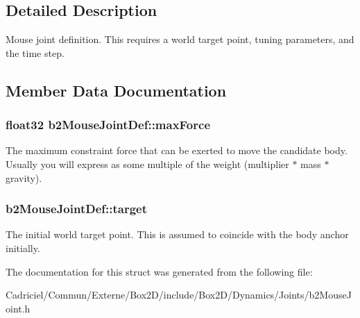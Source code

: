 \subsection{Detailed Description}
Mouse joint definition. This requires a world target point, tuning parameters, and the time step. 

\subsection{Member Data Documentation}
\subsubsection[{\texorpdfstring{max\+Force}{maxForce}}]{\setlength{\rightskip}{0pt plus 5cm}float32 b2\+Mouse\+Joint\+Def\+::max\+Force}\hypertarget{structb2_mouse_joint_def_ae9c52b3afda8ed006eb62fad163cdc3b}{}\label{structb2_mouse_joint_def_ae9c52b3afda8ed006eb62fad163cdc3b}
The maximum constraint force that can be exerted to move the candidate body. Usually you will express as some multiple of the weight (multiplier $\ast$ mass $\ast$ gravity). 
\subsubsection[{\texorpdfstring{target}{target}}]{ b2\+Mouse\+Joint\+Def\+::target}\hypertarget{structb2_mouse_joint_def_aa1b76f72df9aca8d42bdc3e9922e310a}{}\label{structb2_mouse_joint_def_aa1b76f72df9aca8d42bdc3e9922e310a}
The initial world target point. This is assumed to coincide with the body anchor initially. 

The documentation for this struct was generated from the following file\+:\begin{DoxyCompactItemize}
\item 
Cadriciel/\+Commun/\+Externe/\+Box2\+D/include/\+Box2\+D/\+Dynamics/\+Joints/b2\+Mouse\+Joint.\+h\end{DoxyCompactItemize}
